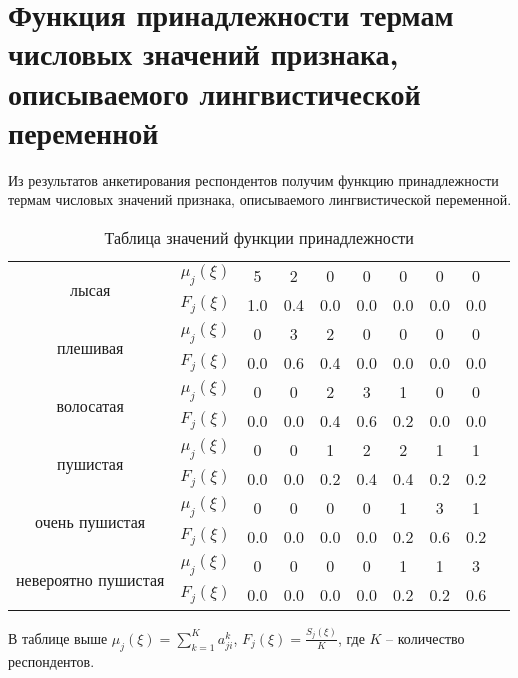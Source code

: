 \section{Функция принадлежности термам числовых значений признака,  описываемого лингвистической переменной}

Из результатов анкетирования респондентов получим функцию принадлежности термам числовых значений признака,  описываемого лингвистической переменной.

\begin{table}[H]
	\begin{center}
	\caption{Таблица значений функции принадлежности}
	\begin{tabular}{|c|c|c|c|c|c|c|c|c|c|}
		\cline{1-9}
		\multirow{2}{*}{лысая}          &  $\mu_j(\xi)$ & 5   & 2   & 0   & 0   & 0   & 0   &  0\\ \cline{2-9}
		& $F_j(\xi)$ & 1.0 & 0.4 & 0.0 & 0.0 & 0.0 & 0.0 &  0.0\\ \cline{1-9}
		\multirow{2}{*}{плешивая}    &  $\mu_j(\xi)$ & 0   & 3   & 2   & 0   & 0   & 0   &  0\\ \cline{2-9}
		& $F_j(\xi)$ & 0.0 & 0.6 & 0.4 & 0.0 & 0.0 & 0.0 & 0.0 \\ \cline{1-9}
		\multirow{2}{*}{волосатая}    &  $\mu_j(\xi)$ & 0   & 0   & 2   & 3   & 1   & 0   &  0\\ \cline{2-9}
		& $F_j(\xi)$ & 0.0 & 0.0 & 0.4 & 0.6 & 0.2 & 0.0 & 0.0 \\ \cline{1-9}
		\multirow{2}{*}{пушистая}             &  $\mu_j(\xi)$ & 0   & 0   & 1   & 2   & 2   & 1   & 1 \\ \cline{2-9}
		& $F_j(\xi)$ & 0.0 & 0.0 & 0.2 & 0.4 & 0.4 & 0.2 & 0.2 \\ \cline{1-9}
		\multirow{2}{*}{очень пушистая}       &  $\mu_j(\xi)$ & 0   & 0   & 0   & 0   & 1   & 3   & 1 \\ \cline{2-9}
		& $F_j(\xi)$ & 0.0 & 0.0 & 0.0 & 0.0 & 0.2 & 0.6 & 0.2 \\ \cline{1-9}
		\multirow{2}{*}{невероятно пушистая} &  $\mu_j(\xi)$ & 0   & 0   & 0   & 0   & 1   & 1   &  3\\ \cline{2-9}
		& $F_j(\xi)$ & 0.0 & 0.0 & 0.0 & 0.0 & 0.2 & 0.2 & 0.6 \\ \cline{1-9}
	\end{tabular}
	\end{center}
\end{table}

В таблице выше $\mu_j(\xi) = \sum\limits_{k=1}^K a^{k}_{ji}$, $F_j(\xi)= \frac{S_j(\xi)}{K}$, где $K$ -- количество респондентов.

